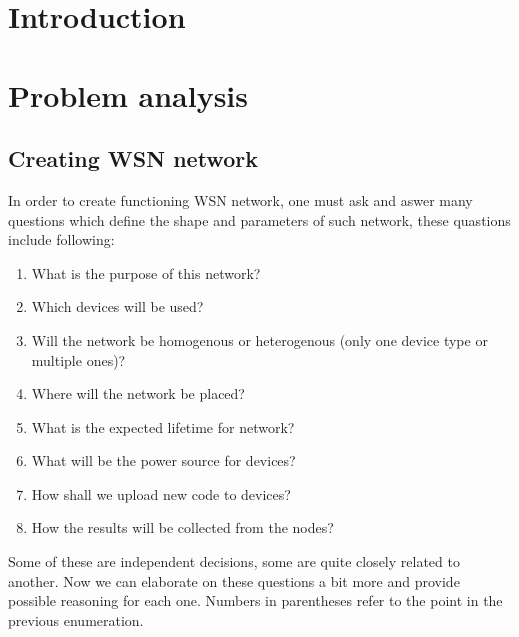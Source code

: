 \documentclass[
  digital, %
  table,   %
  nolof,     %
  nolot,     %
           oneside
]{fithesis3}
\begin{document}

\chapter{Introduction}
\chapter{Problem analysis}

  \section{Creating WSN network}
  In order to create functioning WSN network, one must ask and aswer many questions which define the shape and parameters of such network, these quastions include following:

  \begin{enumerate}

    \item \label{enu:purpose}What is the purpose of this network?
    \item \label{enu:devices}Which devices will be used?
    \item \label{enu:type}Will the network be homogenous or heterogenous (only one device type or multiple ones)?
    \item \label{enu:place}Where will the network be placed?
    \item \label{enu:life}What is the expected lifetime for network?
    \item \label{enu:power}What will be the power source for devices?
    \item \label{enu:upload}How shall we upload new code to devices?
    \item \label{enu:data}How the results will be collected from the nodes?

  \end{enumerate}

  Some of these are independent decisions, some are quite closely related to another. Now we can elaborate on these questions a bit more and provide possible reasoning for each one. Numbers in parentheses refer to the point in the previous enumeration.
\end{document}
